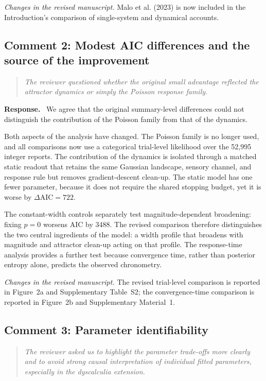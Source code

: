 \documentclass[11pt]{article}
\newenvironment{reviewercomment}{\begin{quote}\color{reviewgray}\itshape}{\end{quote}}
\newenvironment{authorresponse}{\par\noindent\textbf{\color{responseblue}Response.}\ }{\par}
\newcommand{\change}[1]{\par\noindent\textit{Changes in the revised manuscript.} #1\par}
\begin{document}
\change{Malo et al. (2023) is now included in the Introduction's comparison of single-system and dynamical accounts.}

\subsection*{Comment 2: Modest AIC differences and the source of the improvement}

\begin{reviewercomment}
The reviewer questioned whether the original small advantage reflected the attractor dynamics or simply the Poisson response family.
\end{reviewercomment}

\begin{authorresponse}
We agree that the original summary-level differences could not distinguish the contribution of the Poisson family from that of the dynamics.

Both aspects of the analysis have changed. The Poisson family is no longer used, and all comparisons now use a categorical trial-level likelihood over the 52,995 integer reports. The contribution of the dynamics is isolated through a matched static readout that retains the same Gaussian landscape, sensory channel, and response rule but removes gradient-descent clean-up. The static model has one fewer parameter, because it does not require the shared stopping budget, yet it is worse by $\Delta\mathrm{AIC}=722$.

The constant-width controls separately test magnitude-dependent broadening: fixing $p=0$ worsens AIC by 3488. The revised comparison therefore distinguishes the two central ingredients of the model: a width profile that broadens with magnitude and attractor clean-up acting on that profile. The response-time analysis provides a further test because convergence time, rather than posterior entropy alone, predicts the observed chronometry.
\end{authorresponse}

\change{The revised trial-level comparison is reported in Figure~2a and Supplementary Table~S2; the convergence-time comparison is reported in Figure~2b and Supplementary Material~1.}

\subsection*{Comment 3: Parameter identifiability}

\begin{reviewercomment}
The reviewer asked us to highlight the parameter trade-offs more clearly and to avoid strong causal interpretation of individual fitted parameters, especially in the dyscalculia extension.
\end{reviewercomment}
\end{document}
